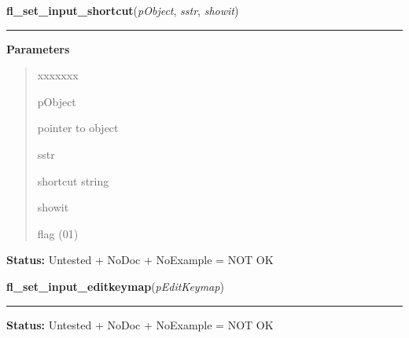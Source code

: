 \hspace{.8\funcindent}\begin{boxedminipage}{\funcwidth}

    \raggedright \textbf{fl\_set\_input\_shortcut}(\textit{pObject}, \textit{sstr}, \textit{showit})

    \vspace{-1.5ex}

    \rule{\textwidth}{0.5\fboxrule}
\setlength{\parskip}{2ex}
\setlength{\parskip}{1ex}
      \textbf{Parameters}
      \vspace{-1ex}

      \begin{quote}
        \begin{Ventry}{xxxxxxx}

          \item[pObject]

          pointer to object

          \item[sstr]

          shortcut string

          \item[showit]

          flag (0{\textbar}1)

        \end{Ventry}

      \end{quote}

\textbf{Status:} Untested + NoDoc + NoExample = NOT OK



    \end{boxedminipage}

    \label{xformslib:library:fl_set_input_editkeymap}

    \vspace{0.5ex}

\hspace{.8\funcindent}\begin{boxedminipage}{\funcwidth}

    \raggedright \textbf{fl\_set\_input\_editkeymap}(\textit{pEditKeymap})

    \vspace{-1.5ex}

    \rule{\textwidth}{0.5\fboxrule}
\setlength{\parskip}{2ex}
\setlength{\parskip}{1ex}
\textbf{Status:} Untested + NoDoc + NoExample = NOT OK



    \end{boxedminipage}

